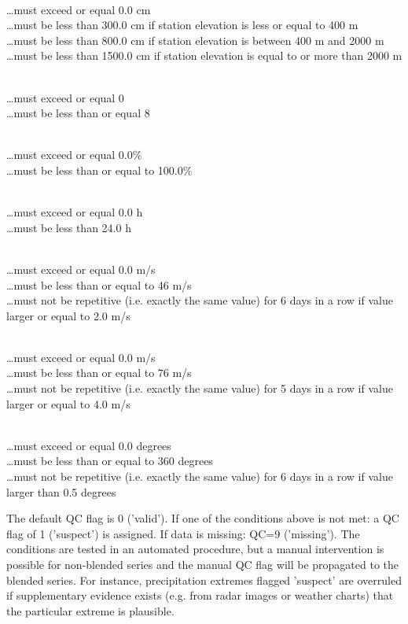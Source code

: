 \documentclass[a4paper,11pt]{article}
\begin{document}
\\
\ldots must exceed or equal 0.0 cm\\
\ldots must be less than 300.0 cm if station elevation is less or equal to 400 m\\
\ldots must be less than 800.0 cm if station elevation is between 400 m and 2000 m\\
\ldots must be less than 1500.0 cm if station elevation is equal to or more than 2000 m
\medskip

\\
\ldots must exceed or equal 0\\
\ldots must be less than or equal 8
\medskip

\\
\ldots must exceed or equal 0.0\%\\
\ldots must be less than or equal to 100.0\%
\medskip

\\
\ldots must exceed or equal 0.0 h\\
\ldots must be less than 24.0 h
\medskip

\\
\ldots must exceed or equal 0.0 m/s\\
\ldots must be less than or equal to 46 m/s\\
\ldots must not be repetitive (i.e. exactly the same value) for 6
days in a row if value larger or equal to 2.0 m/s
\medskip

\\
\ldots must exceed or equal 0.0 m/s\\
\ldots must be less than or equal to 76 m/s\\
\ldots must not be repetitive (i.e. exactly the same value) for 5
days in a row if value larger or equal to 4.0 m/s
\medskip

\\
\ldots must exceed or equal 0.0 degrees\\
\ldots must be less than or equal to 360 degrees\\
\ldots must not be repetitive (i.e. exactly the same value) for 6 days
in a row if value larger than 0.5 degrees
\medskip

The default QC flag is 0 ('valid'). If one of the conditions above is
not met: a QC flag of 1 ('suspect') is assigned. If data is missing:
QC=9 ('missing'). The conditions are tested in an automated procedure,
but a manual intervention is possible for non-blended series and the
manual QC flag will be propagated to the blended series. For instance,
precipitation extremes flagged 'suspect' are overruled if
supplementary evidence exists (e.g. from radar images or weather
charts) that the particular extreme is plausible.
\end{document}
